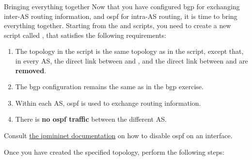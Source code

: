 \begin{exercise}{Bringing everything together}
	Now that you have configured \acs{bgp} for exchanging inter-AS routing information, and \acs{ospf} for intra-AS routing, it is time to bring everything together. Starting from the  and  scripts, you need to create a new script called , that satisfies the following requirements:

	\begin{enumerate}
		\item The topology in the script is the same topology as in the  script, except that, in every AS, the direct link between  and , and the direct link between  and  are \textbf{removed}.
		\item The \acs{bgp} configuration remains the same as in the \acs{bgp} exercise.
		\item Within each AS, \acs{ospf} is used to exchange routing information.
		\item There is \textbf{no \acs{ospf} traffic} between the different AS.
	\end{enumerate}

	\begin{remark}
		Consult \href{https://ipmininet.readthedocs.io/en/latest/daemons.html#ospf6}{the ipmininet documentation} on how to disable \acs{ospf} on an interface.
	\end{remark}

	Once you have created the specified topology, perform the following steps:


\end{exercise}
